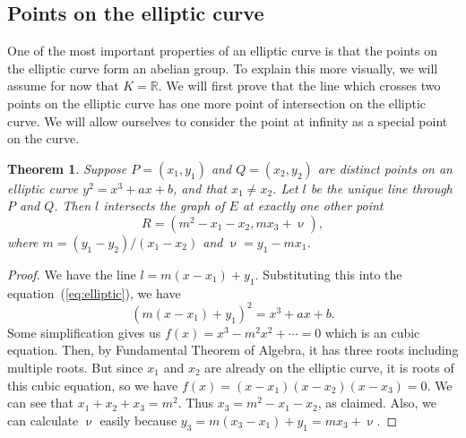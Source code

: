 \documentclass[11pt]{article}
\newtheorem{theorem}{Theorem}
\newcommand{\R}{\ensuremath{\mathbb{R}}}
\begin{document}
\subsection{Points on the elliptic curve}
One of the most important properties of an elliptic curve is that the points on the elliptic curve form an abelian group. To explain this more visually, we will assume for now that $K = \R$. We will first prove that the line which crosses two points on the elliptic curve has one more point of intersection on the elliptic curve. We will allow ourselves to consider the point at infinity as a special point on the curve.
\begin{theorem}
Suppose $P = (x_1, y_1)$ and $Q = (x_2, y_2)$ are distinct points on an elliptic curve $y^2 = x^3 + ax + b$, and that $x_1 \ne x_2$. Let $l$ be the unique line through $P$ and $Q$. Then $l$ intersects the graph of $E$ at exactly one other point
$$R = (m^2 - x_1 - x_2, mx_3 + \upnu),$$
where $m = (y_1-y_2)/(x_1-x_2)$ and $\upnu = y_1 - mx_1$.
\end{theorem}
\begin{proof}
We have the line $l = m(x - x_1) + y_1$. Substituting this into the equation~(\ref{eq:elliptic}), we have
$$(m(x - x_1) + y_1)^2 = x^3 + ax + b.$$
Some simplification gives us $f(x) = x^3 - m^2x^2 + \cdots = 0$ which is an cubic equation. Then, by Fundamental Theorem of Algebra, it has three roots including multiple roots. But since $x_1$ and $x_2$ are already on the elliptic curve, it is roots of this cubic equation, so we have $f(x) = (x-x_1)(x-x_2)(x-x_3) = 0$. We can see that $x_1 + x_2 + x_3 = m^2$. Thus $x_3 = m^2 - x_1 - x_2$, as claimed. Also, we can calculate $\upnu$ easily because $y_3 = m(x_3 - x_1) + y_1 = mx_3 + \upnu$.
\end{proof}
\end{document}

